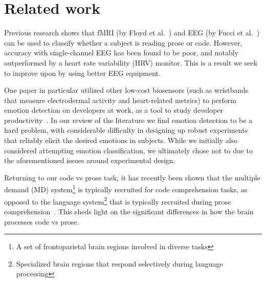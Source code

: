 \vfill

\section{Related work}


    Previous research shows that fMRI (by Floyd et al.~\cite{floyd_decoding_2017}) and EEG (by Fucci et al.~\cite{fucci_replication_2019}) can be used to classify whether a subject is reading prose or code. However, accuracy with single-channel EEG has been found to be poor, and notably outperformed by a heart rate variability (HRV) monitor. This is a result we seek to improve upon by using better EEG equipment.

    One paper in particular utilized other low-cost biosensors (such as wristbands that measure electrodermal activity and heart-related metrics) to perform emotion detection on developers at work, as a tool to study developer productivity~\cite{girardi_recognizing_2020}. In our review of the literature we find emotion detection to be a hard problem, with considerable difficulty in designing up robust experiments that reliably elicit the desired emotions in subjects. While we initially also considered attempting emotion classification, we ultimately chose not to due to the aforementioned issues around experimental design.

    Returning to our code vs prose task, it has recently been shown that the multiple demand (MD) system\footnote{A set of frontoparietal brain regions involved in diverse tasks} is typically recruited for code comprehension tasks, as opposed to the language system\footnote{Specialized brain regions that respond selectively during language processing} that is typically recruited during prose comprehension~\cite{ivanova_comprehension_2020}. This sheds light on the significant differences in how the brain processes code vs prose.

